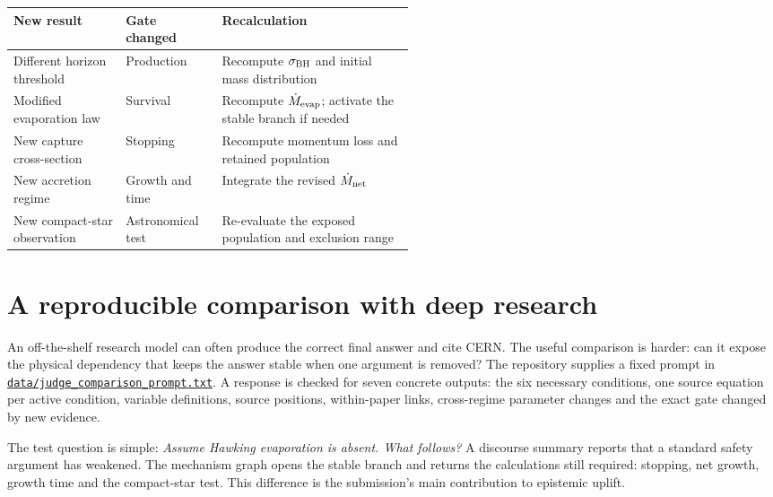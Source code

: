 \documentclass[10pt]{article}
\newcommand{\sourcefile}[2]{\href{https://github.com/synthetix-institute/lhc-mechanism-audit/blob/main/#1}{\texttt{#2}}}
\begin{document}
\begin{center}
\begin{tabularx}{0.96\linewidth}{P{0.28\linewidth}P{0.24\linewidth}Y}
\toprule
New result & Gate changed & Recalculation \\
\midrule
Different horizon threshold & Production & Recompute $\sigma_{\rm BH}$ and initial mass distribution \\
Modified evaporation law & Survival & Recompute $\dot M_{\rm evap}$; activate the stable branch if needed \\
New capture cross-section & Stopping & Recompute momentum loss and retained population \\
New accretion regime & Growth and time & Integrate the revised $\dot M_{\rm net}$ \\
New compact-star observation & Astronomical test & Re-evaluate the exposed population and exclusion range \\
\bottomrule
\end{tabularx}
\end{center}

\section{A reproducible comparison with deep research}

An off-the-shelf research model can often produce the correct final answer and cite CERN. The useful comparison is harder: can it expose the physical dependency that keeps the answer stable when one argument is removed? The repository supplies a fixed prompt in \sourcefile{data/judge_comparison_prompt.txt}{data/judge\_comparison\_prompt.txt}. A response is checked for seven concrete outputs: the six necessary conditions, one source equation per active condition, variable definitions, source positions, within-paper links, cross-regime parameter changes and the exact gate changed by new evidence.

The test question is simple: \emph{Assume Hawking evaporation is absent. What follows?} A discourse summary reports that a standard safety argument has weakened. The mechanism graph opens the stable branch and returns the calculations still required: stopping, net growth, growth time and the compact-star test. This difference is the submission's main contribution to epistemic uplift.
\end{document}
